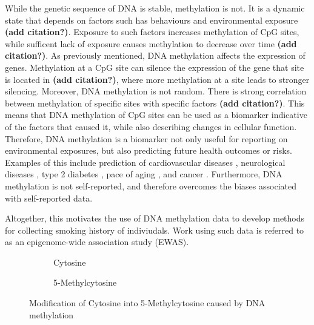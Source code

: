 \documentclass{article}
\begin{document}
While the genetic sequence of DNA is stable, methylation is not. It is a dynamic state that depends on factors such has behaviours and environmental exposure \textbf{(add citation?)}. Exposure to such factors increases methylation of CpG sites, while sufficent lack of exposure causes methylation to decrease over time \textbf{(add citation?)}. As previously mentioned, DNA methylation affects the expression of genes. Methylation at a CpG site can silence the expression of the gene that site is located in \textbf{(add citation?)}, where more methylation at a site leads to stronger silencing. Moreover, DNA methylation is not random. There is strong correlation between methylation of specific sites with specific factors \textbf{(add citation?)}. This means that DNA methylation of CpG sites can be used as a biomarker indicative of the factors that caused it, while also describing changes in cellular function. Therefore, DNA methylation is a biomarker not only useful for reporting on environmental exposures, but also predicting future health outcomes or risks. Examples of this include prediction of cardiovascular diseases \cite{cameron2023dna}, neurological diseases \cite{cells11213439}, type 2 diabetes \cite{cheng2023development}, pace of aging \cite{10.7554/eLife.73420}, and cancer \cite{luo2020circulating}. Furthermore, DNA methylation is not self-reported, and therefore overcomes the biases associated with self-reported data.

Altogether, this motivates the use of DNA methylation data to develop methods for collecting smoking history of indiviudals. Work using such data is referred to as an epigenome-wide association study (EWAS).

\begin{figure}
    \begin{subfigure}{0.49\textwidth}
        \centering
        \hspace*{11mm}
        \vspace{3mm}
        \caption{Cytosine}
    \end{subfigure}
    \begin{subfigure}{0.49\textwidth}
        \centering
        \vspace{3mm}
        \caption{5-Methylcytosine}
    \end{subfigure}
    \caption*{Modification of Cytosine into 5-Methylcytosine caused by DNA methylation}
\end{figure}
\end{document}
